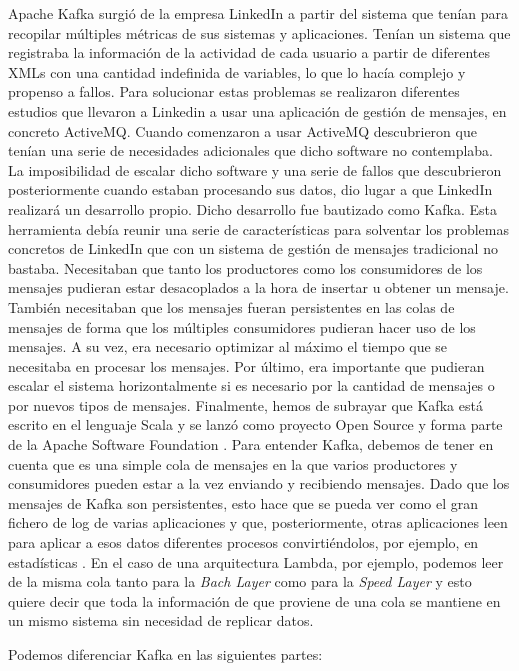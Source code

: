 Apache Kafka surgió de la empresa LinkedIn a partir del sistema que tenían
para recopilar múltiples métricas de sus sistemas y aplicaciones. Tenían un
sistema que registraba la información de la actividad de cada usuario a
partir de diferentes XMLs con una cantidad indefinida de variables, lo que
lo hacía complejo y propenso a fallos. Para solucionar estas problemas se
realizaron diferentes estudios que llevaron a Linkedin a usar una
aplicación de gestión de mensajes, en concreto ActiveMQ. Cuando comenzaron
a usar ActiveMQ descubrieron que tenían una serie de necesidades
adicionales que dicho software no contemplaba. La imposibilidad de escalar
dicho software y una serie de fallos que descubrieron posteriormente cuando
estaban procesando sus datos, dio lugar a que LinkedIn realizará un
desarrollo propio. Dicho desarrollo fue bautizado como Kafka. Esta
herramienta debía reunir una serie de características para solventar los
problemas concretos de LinkedIn que con un sistema de gestión de mensajes
tradicional no bastaba. Necesitaban que tanto los productores como los
consumidores de los mensajes pudieran estar desacoplados a la hora de
insertar u obtener un mensaje. También necesitaban que los mensajes fueran
persistentes en las colas de mensajes de forma que los múltiples
consumidores pudieran hacer uso de los mensajes. A su vez, era necesario
optimizar al máximo el tiempo que se necesitaba en procesar los mensajes.
Por último, era importante que pudieran escalar el sistema horizontalmente
si es necesario por la cantidad de mensajes o por nuevos tipos de mensajes.
Finalmente, hemos de subrayar que Kafka está escrito en el lenguaje Scala y
se lanzó como proyecto Open Source y forma parte de la Apache Software
Foundation \cite{Kfk-1}. Para entender Kafka, debemos de tener en cuenta
que es una simple cola de mensajes en la que varios productores y
consumidores pueden estar a la vez enviando y recibiendo mensajes. Dado que
los mensajes de Kafka son persistentes, esto hace que se pueda ver como el
gran fichero de log de varias aplicaciones y que, posteriormente, otras
aplicaciones leen para aplicar a esos datos diferentes procesos
convirtiéndolos, por ejemplo, en estadísticas \cite{Kfk-6}. En el caso de
una arquitectura Lambda, por ejemplo, podemos leer de la misma cola tanto
para la \emph{Bach Layer} como para la \emph{Speed Layer} y esto quiere
decir que toda la información de que proviene de una cola se mantiene en un
mismo sistema sin necesidad de replicar datos.

Podemos diferenciar Kafka en las siguientes partes:

